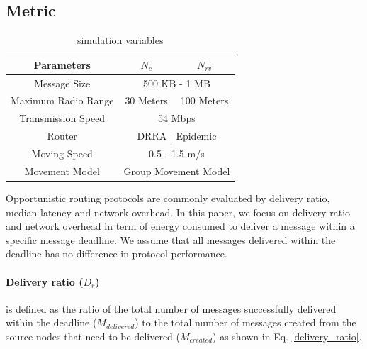 \documentclass[conference]{IEEEtran}
\begin{document}
\subsection{Metric}
\begin{table}[!t]
	\renewcommand{\arraystretch}{1.3}
	\caption{simulation variables}
	\label{table_parameters}
	\centering
	\begin{tabular}{|c|c|c|}
		\hline
		Parameters         &  $N_{c}$ & $N_{rv}$ \\ \hline
		Message Size       &  \multicolumn{2}{|c|}{500 KB - 1 MB}        \\ \hline
		Maximum Radio Range & 30 Meters  & 100 Meters \\ \hline
		Transmission Speed &  \multicolumn{2}{|c|}{ 54 Mbps   }        \\ \hline
		Router             & \multicolumn{2}{|c|}{ DRRA | Epidemic   } \\ \hline
		Moving Speed       &   \multicolumn{2}{|c|}{0.5 - 1.5 m/s }        \\ \hline
		Movement Model     &   \multicolumn{2}{|c|}{Group Movement Model  }      \\ \hline
	\end{tabular}
\end{table}

Opportunistic routing protocols are commonly evaluated by delivery ratio, median latency and network overhead.
In this paper, we focus on delivery ratio and network overhead in term of energy consumed to deliver a message within a specific message deadline.
We assume that all messages delivered within the deadline has no difference in protocol performance.


\paragraph{Delivery ratio ($D_{r}$)} is defined as the ratio of the total number of messages successfully delivered within the deadline ($ { M }_{ delivered }$) to the total number of messages created from the source nodes that need to be delivered ($ { M }_{ created }$) as shown in Eq. \ref{delivery_ratio}.
\end{document}
